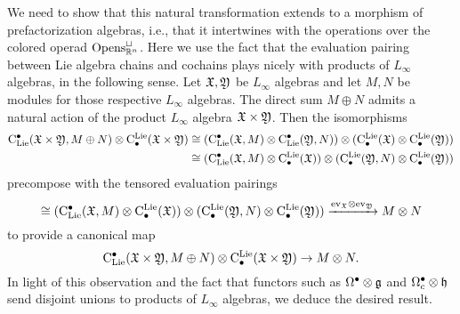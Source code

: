 \documentclass[11pt]{amsart}
\numberwithin{equation}{section}
\begin{document}

We need to show that this natural transformation extends to a morphism of prefactorization algebras,
i.e., that it intertwines with the operations over the colored operad ${\rm Opens}_{\mathbb R^n}^\sqcup$.
Here we use the fact that the evaluation pairing between Lie algebra chains and cochains plays nicely with products of $L_\infty$ algebras, in the following sense.
Let $\mathfrak X, \mathfrak Y$ be $L_\infty$ algebras and let $M, N$ be modules for those respective $L_\infty$ algebras.
The direct sum $M \oplus N$ admits a natural action of the product $L_\infty$ algebra $\mathfrak X \times \mathfrak Y$.
Then the isomorphisms
\begin{align*}
{\rm C}_{\rm Lie}^\bullet(\mathfrak X \times \mathfrak Y, M \oplus N) \otimes {\rm C}^{\rm Lie}_\bullet(\mathfrak X \times \mathfrak Y) 
&\cong ({\rm C}_{\rm Lie}^\bullet(\mathfrak X, M) \otimes {\rm C}_{\rm Lie}^\bullet(\mathfrak Y,N) ) \otimes ({\rm C}^{\rm Lie}_\bullet(\mathfrak X) \otimes {\rm C}^{\rm Lie}_\bullet(\mathfrak Y) ) \\
&\cong ({\rm C}_{\rm Lie}^\bullet(\mathfrak X,M) \otimes {\rm C}^{\rm Lie}_\bullet(\mathfrak X) ) \otimes ({\rm C}^{\rm Lie}_\bullet(\mathfrak Y,N) \otimes {\rm C}^{\rm Lie}_\bullet(\mathfrak Y) )
\end{align*}
precompose with the tensored evaluation pairings
\[
\cong ({\rm C}_{\rm Lie}^\bullet(\mathfrak X,M) \otimes {\rm C}^{\rm Lie}_\bullet(\mathfrak X) ) \otimes ({\rm C}^{\rm Lie}_\bullet(\mathfrak Y,N) \otimes {\rm C}^{\rm Lie}_\bullet(\mathfrak Y) ) \xrightarrow{{\rm ev}_\mathfrak X \otimes {\rm ev}_\mathfrak Y} M \otimes N
\]
to provide a canonical map
\[
{\rm C}_{\rm Lie}^\bullet(\mathfrak X \times \mathfrak Y, M \oplus N) \otimes {\rm C}^{\rm Lie}_\bullet(\mathfrak X \times \mathfrak Y) \to M \otimes N.
\]
In light of this observation and the fact that functors such as $\Omega^\bullet \otimes \mathfrak g$ and $\Omega^\bullet_c \otimes \mathfrak h$ send disjoint unions to products of $L_\infty$ algebras,
we deduce the desired result.
\end{document}

